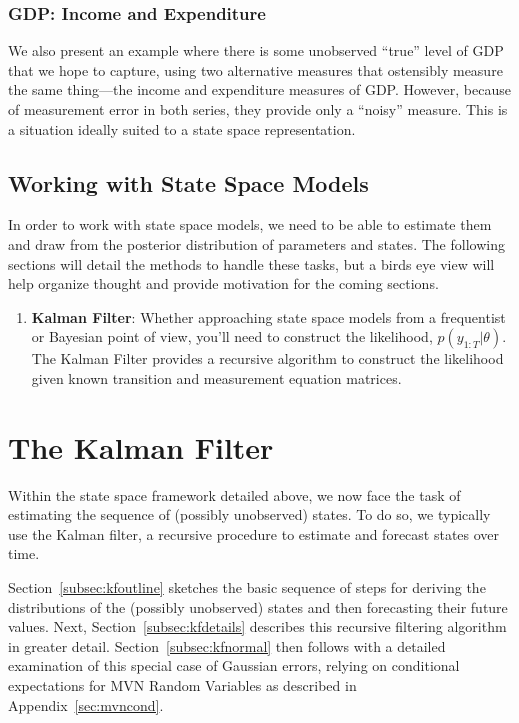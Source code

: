 \documentclass[a4paper,12pt]{article}
\begin{document}
\subsubsection{GDP: Income and Expenditure}
We also present an example where there is some unobserved ``true'' level
of GDP that we hope to capture, using two alternative measures that
ostensibly measure the same thing---the income and expenditure measures
of GDP\@. However, because of measurement error in both series, they
provide only a ``noisy'' measure. This is a situation ideally suited to
a state space representation.

\clearpage
\subsection{Working with State Space Models}

In order to work with state space models, we need to be able to
estimate them and draw from the posterior distribution of parameters and
states.  The following sections will detail the methods to handle these
tasks, but a birds eye view will help organize thought and provide
motivation for the coming sections.
\begin{enumerate}
  \item \textbf{Kalman Filter}: Whether approaching state space models
    from a frequentist or Bayesian point of view, you'll need to
    construct the likelihood, $p(y_{1:T}|\theta)$. The Kalman Filter
    provides a recursive algorithm to construct the likelihood given
    known transition and measurement equation matrices.

\end{enumerate}



\newpage
\section{The Kalman Filter}

Within the state space framework detailed above, we now face the task of estimating the sequence of (possibly unobserved) states. To do so, we typically use the Kalman filter, a recursive procedure to estimate and forecast states over time. 

Section~\ref{subsec:kfoutline} sketches the basic sequence of steps for
deriving the distributions of the (possibly unobserved) states and then
forecasting their future values. Next, Section~\ref{subsec:kfdetails}
describes this recursive filtering algorithm in greater detail.
Section~\ref{subsec:kfnormal} then follows with a detailed examination
of this special case of Gaussian errors, relying on conditional
expectations for MVN Random Variables as described in
Appendix~\ref{sec:mvncond}.
\end{document}
